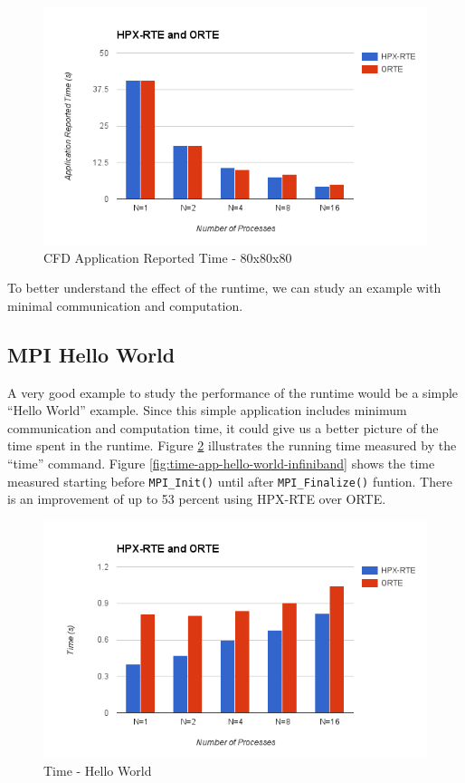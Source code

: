 \begin{figure}[h]
  \centering
  \includegraphics[scale=0.7]{images/time-app-heatsolver-80-infiniband.png}
  \caption[CFD Application Reported Time - 80x80x80]{CFD Application Reported Time - 80x80x80}
  \label{fig:time-app-heatsolver-80-infiniband}
\end{figure}

To better understand the effect of the runtime, we can study an example with minimal communication and computation. 

\clearpage
\subsection{MPI Hello World}
A very good example to study the performance of the runtime would be a simple ``Hello World'' example. Since this simple application includes minimum communication and computation time, it could give us a better picture of the time spent in the runtime. Figure \ref{fig:time-all-hello-world-infiniband} illustrates the running time measured by the ``time'' command. Figure \ref{fig:time-app-hello-world-infiniband} shows the time measured starting before \verb|MPI_Init()| until after \verb|MPI_Finalize()| funtion. There is an improvement of up to 53 percent using HPX-RTE over ORTE.

\begin{figure}[h!]
\centering
\includegraphics[scale=0.7]{images/time-all-hello-world-infiniband.png}
\caption[Time - Hello World]{Time - Hello World}
\label{fig:time-all-hello-world-infiniband}
\end{figure}


